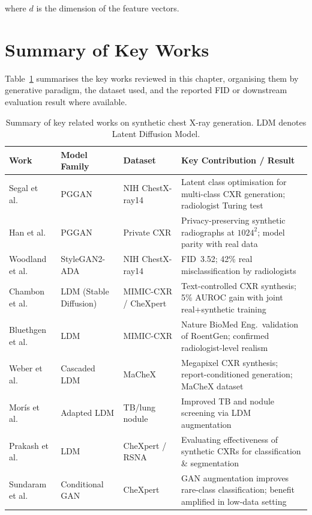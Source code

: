 where $d$ is the dimension of the feature vectors.


\section{Summary of Key Works}
\label{sec:rw_summary}

Table~\ref{tab:related_works_summary} summarises the key works reviewed in this chapter,
organising them by generative paradigm, the dataset used, and the reported FID or
downstream evaluation result where available.

\begin{table}[ht]
\centering
\small
\begin{tabular}{|p{3.8cm}|p{2.5cm}|p{3.0cm}|p{4.8cm}|}
\hline
\textbf{Work} & \textbf{Model Family} & \textbf{Dataset} & \textbf{Key Contribution / Result} \\
\hline
Segal et al.~\cite{Segal2021} & PGGAN & NIH ChestX-ray14 & Latent class optimisation for multi-class CXR generation; radiologist Turing test \\
\hline
Han et al.~\cite{Han2020} & PGGAN & Private CXR & Privacy-preserving synthetic radiographs at $1024^2$; model parity with real data \\
\hline
Woodland et al.~\cite{Woodland2022} & StyleGAN2-ADA & NIH ChestX-ray14 & FID~3.52; 42\% real misclassification by radiologists \\
\hline
Chambon et al.~\cite{Chambon2022RoentGen} & LDM (Stable Diffusion) & MIMIC-CXR / CheXpert & Text-controlled CXR synthesis; 5\% AUROC gain with joint real+synthetic training \\
\hline
Bluethgen et al.~\cite{Bluethgen2024} & LDM & MIMIC-CXR & Nature BioMed Eng.\ validation of RoentGen; confirmed radiologist-level realism \\
\hline
Weber et al.~\cite{Weber2023Cheff} & Cascaded LDM & MaCheX & Megapixel CXR synthesis; report-conditioned generation; MaCheX dataset \\
\hline
Mor\'is et al.~\cite{Moris2024} & Adapted LDM & TB/lung nodule & Improved TB and nodule screening via LDM augmentation \\
\hline
Prakash et al.~\cite{Prakash_2025_ICCV} & LDM & CheXpert / RSNA & Evaluating effectiveness of synthetic CXRs for classification \& segmentation \\
\hline
Sundaram et al.~\cite{Sundaram2021} & Conditional GAN & CheXpert & GAN augmentation improves rare-class classification; benefit amplified in low-data setting \\
\hline
\end{tabular}
\caption{Summary of key related works on synthetic chest X-ray generation. LDM denotes Latent Diffusion Model.}
\label{tab:related_works_summary}
\end{table}

